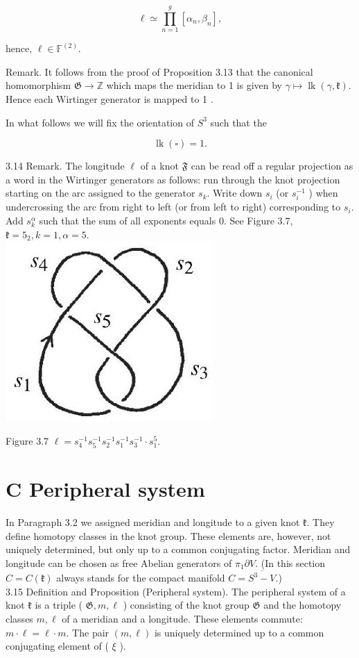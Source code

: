 \documentclass[10pt, letterpaper]{article}
\begin{document}
$$
\ell \simeq \prod_{n=1}^{g}\left[\alpha_{n}, \beta_{n}\right],
$$

hence, $\ell \in \mathbb{F}^{(2)}$.

Remark. It follows from the proof of Proposition 3.13 that the canonical homomorphism $\mathfrak{G} \rightarrow \mathbb{Z}$ which maps the meridian to 1 is given by $\gamma \mapsto \operatorname{lk}(\gamma, \mathfrak{k})$. Hence each Wirtinger generator is mapped to 1 .

In what follows we will fix the orientation of $S^{3}$ such that the

$$
\operatorname{lk}(\square)=1 .
$$

3.14 Remark. The longitude $\ell$ of a knot $\mathfrak{F}$ can be read off a regular projection as a word in the Wirtinger generators as follows: run through the knot projection starting on the arc assigned to the generator $s_{k}$. Write down $s_{i}$ (or $s_{i}^{-1}$ ) when undercrossing the arc from right to left (or from left to right) corresponding to $s_{i}$. Add $s_{k}^{\alpha}$ such that the sum of all exponents equals 0. See Figure 3.7, $\mathfrak{k}=5_{2}, k=1, \alpha=5$.\\
\includegraphics[scale=0.2, center]{2025_05_21_9c06be8de7a55410f8c1g-054}

Figure 3.7 $\ell=s_{4}^{-1} s_{5}^{-1} s_{2}^{-1} s_{1}^{-1} s_{3}^{-1} \cdot s_{1}^{5}$.

\section*{C Peripheral system}
In Paragraph 3.2 we assigned meridian and longitude to a given knot $\mathfrak{k}$. They define homotopy classes in the knot group. These elements are, however, not uniquely determined, but only up to a common conjugating factor. Meridian and longitude can be chosen as free Abelian generators of $\pi_{1} \partial V$. (In this section $C=C(\mathfrak{k})$ always stands for the compact manifold $C=\overline{S^{3}-V}$.)\\
3.15 Definition and Proposition (Peripheral system). The peripheral system of a knot $\mathfrak{k}$ is a triple ( $\mathfrak{G}, m, \ell$ ) consisting of the knot group $\mathfrak{G}$ and the homotopy classes $m, \ell$ of a meridian and a longitude. These elements commute: $m \cdot \ell=\ell \cdot m$. The pair $(m, \ell)$ is uniquely determined up to a common conjugating element of ( $\xi$ ).
\end{document}
